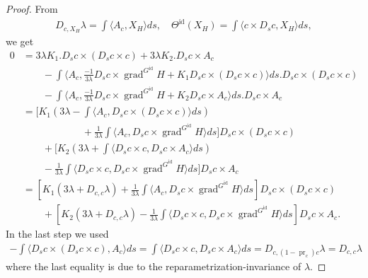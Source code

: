 \documentclass[12pt]{amsart}
\theoremstyle{definition}
\newcommand{\id}{\mathrm{id}}
\def\la{\lambda}
\def\Th{\Theta}
\def\x{\times}
\let\on=\operatorname
\begin{document}
\begin{proof}
    From 
    \begin{align}
        D_{c,X_H}\la=\int \langle A_c,X_H\rangle ds, \quad
        \Th^\id(X_H)=\int \langle c\x D_s c, X_H \rangle ds,
    \end{align}
    we get 
    \begin{align}
        0
        &=3 \la K_1. D_s c \x (D_s c \x c) + 3\la K_2. D_s c \x A_c\\  
        &\qquad - \int \langle A_c, \frac{-1}{3\la} D_s c \x \on{grad}^{G^\id} H + K_1 D_s c \x( D_s c \x c) \rangle ds. D_s c \x (D_s c \x c)\\
        & \qquad - \int \langle A_c, \frac{-1}{3\la} D_s c \x \on{grad}^{G^\id} H + K_2 D_s c \x A_c\rangle ds. D_s c \x A_c\\
        &= \Big[ K_1  \left(3\la-\int \langle A_c, D_sc \x (D_s c \x c)\rangle ds \right) 
        \\&\qquad\qquad\qquad  
        +\frac{1}{3\la}\int \langle A_c,D_s c \x \on{grad}^{G^\id} H\rangle ds \Big] D_s c \x (D_s c \x c)
        \\&\qquad 
        + \Big[ K_2  \left(3\la+\int \langle D_ s c \x c, D_sc \x A_c \rangle ds \right) 
        \\&\qquad  
        -\frac{1}{3\la}\int \langle D_s c \x c,  D_s c \x \on{grad}^{G^\id} H\rangle ds \Big] D_s c \x A_c 
        \\& \label{eq:temporal_XH_with_K} 
        =\left[ K_1  \left(3\la+D_{c,c}\la \right) +\frac{1}{3\la}\int \langle A_c,D_s c \x \on{grad}^{G^\id} H\rangle ds \right] D_s c \x (D_s c \x c)
        \\&\qquad  
        + \left[ K_2  \left(3\la+D_{c,c}\la \right) -\frac{1}{3\la}\int \langle D_s c \x c,  D_s c \x \on{grad}^{G^\id} H\rangle ds \right] D_s c \x A_c.
    \end{align}
    In the last step we used  
    \begin{align}
        -\int \langle  D_sc \x (D_s c \x c), A_c\rangle ds  
        = \int \langle D_ s c \x c, D_sc \x A_c \rangle ds 
        = D_{c,(1-\on{pr}_c) c}\la
        =D_{c,c}\la
    \end{align}
    where the last equality is due to the reparametrization-invariance of $\la$.


\end{proof}
\end{document}
